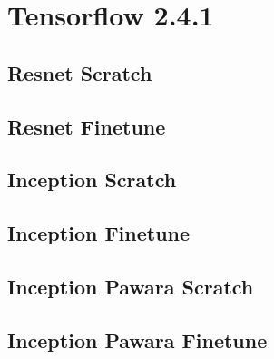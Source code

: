 \newpage






\section{Tensorflow 2.4.1}

\subsection{Resnet Scratch}
\begin{figure}[H]

\end{figure}

\subsection{Resnet Finetune}
\begin{figure}[H]

\end{figure}

\newpage

\subsection{Inception Scratch}
\begin{figure}[H]

\end{figure}
\subsection{Inception Finetune}
\begin{figure}[H]

\end{figure}

\newpage

\subsection{Inception Pawara Scratch}
\begin{figure}[H]

\end{figure}

\subsection{Inception Pawara Finetune}
\begin{figure}[H]

\end{figure}




